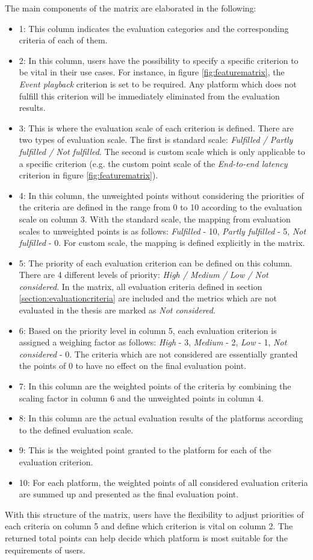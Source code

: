 The main components of the matrix are elaborated in the following:
\begin{itemize}
	\item 1: This column indicates the evaluation categories and the corresponding criteria of each of them.
	\item 2: In this column, users have the possibility to specify a specific criterion to be vital in their use cases. For instance, in figure \ref{fig:featurematrix}, the \emph{Event playback} criterion is set to be required. Any platform which does not fulfill this criterion will be immediately eliminated from the evaluation results.
	\item 3: This is where the evaluation scale of each criterion is defined. There are two types of evaluation scale. The first is standard scale: \emph{Fulfilled / Partly fulfilled / Not fulfilled}. The second is custom scale which is only applicable to a specific criterion (e.g. the custom point scale of the \emph{End-to-end latency} criterion in figure \ref{fig:featurematrix}). 
	\item 4: In this column, the unweighted points without considering the priorities of the criteria are defined in the range from 0 to 10 according to the evaluation scale on column 3. With the standard scale, the mapping from evaluation scales to unweighted points is as follows: \emph{Fulfilled} - 10, \emph{Partly fulfilled} - 5, \emph{Not fulfilled} - 0. For custom scale, the mapping is defined explicitly in the matrix. 
	\item 5: The priority of each evaluation criterion can be defined on this column. There are 4 different levels of priority: \emph{High / Medium / Low / Not considered}. In the matrix, all evaluation criteria defined in section \ref{section:evaluationcriteria} are included and the metrics which are not evaluated in the thesis are marked as \emph{Not considered}.
	\item 6: Based on the priority level in column 5, each evaluation criterion is assigned a weighing factor as follows: \emph{High} - 3, \emph{Medium} - 2, \emph{Low} - 1, \emph{Not considered} - 0. The criteria which are not considered are essentially granted the points of 0 to have no effect on the final evaluation point.
	\item 7: In this column are the weighted points of the criteria by combining the scaling factor in column 6 and the unweighted points in column 4.
	\item 8: In this column are the actual evaluation results of the platforms according to the defined evaluation scale.
	\item 9: This is the weighted point granted to the platform for each of the evaluation criterion.
	\item 10: For each platform, the weighted points of all considered evaluation criteria are summed up and presented as the final evaluation point.  
\end{itemize}

With this structure of the matrix, users have the flexibility to adjust priorities of each criteria on column 5 and define which criterion is vital on column 2. The returned total points can help decide which platform is most suitable for the requirements of users.